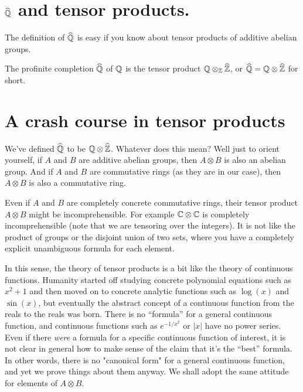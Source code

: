 \section{\texorpdfstring{$\widehat{\mathbb{Q}}$}{Qhat} and tensor products.}

The definition of $\widehat{\mathbb{Q}}$ is easy if you know about tensor products
of additive abelian groups.

\begin{definition}
    \label{QHat}
    \leanok
    The profinite completion $\widehat{\mathbb{Q}}$ of $\mathbb{Q}$ is the tensor product $\mathbb{Q}\otimes_{\mathbb{Z}}\widehat{\mathbb{Z}}$,
    or $\widehat{\mathbb{Q}}=\mathbb{Q}\otimes\widehat{\mathbb{Z}}$ for short.
\end{definition}

\section{A crash course in tensor products}

We've defined $\widehat{\mathbb{Q}}$ to be $\mathbb{Q}\otimes\widehat{\mathbb{Z}}$. Whatever does this mean? Well just to orient yourself,
if $A$ and $B$ are additive abelian groups, then $A\otimes B$ is also an abelian group. 
And if $A$ and $B$ are commutative rings (as they are in our case), then $A\otimes B$ is also
a commutative ring. 

Even if $A$ and $B$ are completely concrete commutative rings, their tensor product $A\otimes B$
might be incomprehensible. For example $\mathbb{C}\otimes\mathbb{C}$ is completely incomprehensible (note that we are
tensoring over the integers). It is not like the product of groups or the disjoint union of
two sets, where you have a completely explicit unambiguous formula for each element. 

In this sense, the theory of tensor products is a bit like the theory of continuous functions. 
Humanity started off studying concrete polynomial equations such as $x^2+1$ and then moved on to 
concrete analytic functions such as $\log(x)$ and $\sin(x)$, but eventually the abstract concept 
of a continuous function from the reals to the reals was born. There is no ``formula'' for a general 
continuous function, and continuous functions such as $e^{-1/x^2}$ or $|x|$ have no power series.
Even if there \emph{were} a formula for a specific continuous function of interest, it is not clear 
in general how to make sense of the claim that it's the ``best'' formula. In other words, there is 
no "canonical form" for a general continuous function, and yet we prove things about them anyway. 
We shall adopt the same attitude for elements of $A\otimes B$.

